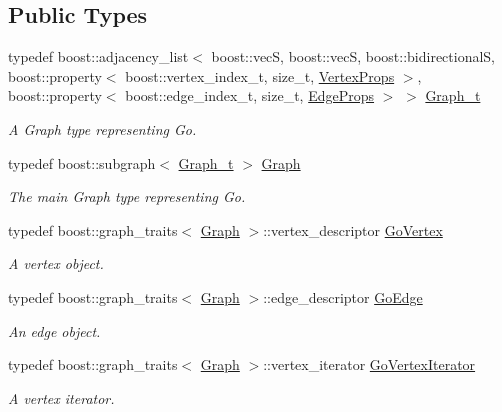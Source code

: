 \subsection*{Public Types}
\begin{DoxyCompactItemize}
\item 
typedef boost\+::adjacency\+\_\+list$<$ boost\+::vecS, boost\+::vecS, boost\+::bidirectionalS, boost\+::property$<$ boost\+::vertex\+\_\+index\+\_\+t, size\+\_\+t, \hyperlink{structGoGraph_1_1VertexProps}{Vertex\+Props} $>$, boost\+::property$<$ boost\+::edge\+\_\+index\+\_\+t, size\+\_\+t, \hyperlink{structGoGraph_1_1EdgeProps}{Edge\+Props} $>$ $>$ \hyperlink{classGoGraph_a2586bfc8740625d2d615662ac86f10f9}{Graph\+\_\+t}
\begin{DoxyCompactList}\small\item\em A Graph type representing Go. \end{DoxyCompactList}\item 
typedef boost\+::subgraph$<$ \hyperlink{classGoGraph_a2586bfc8740625d2d615662ac86f10f9}{Graph\+\_\+t} $>$ \hyperlink{classGoGraph_aae4ae00d4785dcee01a514feb768f380}{Graph}
\begin{DoxyCompactList}\small\item\em The main Graph type representing Go. \end{DoxyCompactList}\item 
typedef boost\+::graph\+\_\+traits$<$ \hyperlink{classGoGraph_aae4ae00d4785dcee01a514feb768f380}{Graph} $>$\+::vertex\+\_\+descriptor \hyperlink{classGoGraph_afabec0fb17c98de989e7dd9f3a54e650}{Go\+Vertex}
\begin{DoxyCompactList}\small\item\em A vertex object. \end{DoxyCompactList}\item 
typedef boost\+::graph\+\_\+traits$<$ \hyperlink{classGoGraph_aae4ae00d4785dcee01a514feb768f380}{Graph} $>$\+::edge\+\_\+descriptor \hyperlink{classGoGraph_a6a06a7cf401fba8f03f8f68b54744a75}{Go\+Edge}
\begin{DoxyCompactList}\small\item\em An edge object. \end{DoxyCompactList}\item 
typedef boost\+::graph\+\_\+traits$<$ \hyperlink{classGoGraph_aae4ae00d4785dcee01a514feb768f380}{Graph} $>$\+::vertex\+\_\+iterator \hyperlink{classGoGraph_a1e893efb01d71292881b2fa45c771b79}{Go\+Vertex\+Iterator}
\begin{DoxyCompactList}\small\item\em A vertex iterator. \end{DoxyCompactList}\item 

\end{DoxyCompactItemize}

